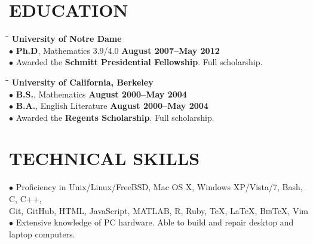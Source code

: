 \documentclass{resume}
\begin{document}
\begin{resume}
	\section{EDUCATION}  \vspace{0.05in}
	\begin{tabbing}
\hspace{2.3in}\= \hspace{2.6in}\= \kill
\textbf{University of Notre Dame} \\
$\bullet$ \textbf{Ph.D}, Mathematics 3.9/4.0 \>\>\textbf{August 2007--May 2012}
\\ 
$\bullet$ Awarded the \textbf{Schmitt Presidential Fellowship}. Full scholarship. \\
      \end{tabbing}	
	\vspace{-0.5in} 
	\begin{tabbing}
\hspace{2.3in}\= \hspace{2.6in}\= \kill
\textbf{University of California, Berkeley}
\\
$\bullet$ \textbf{B.S.}, Mathematics \>\>\textbf{August 2000--May 2004}
\\
$\bullet$ \textbf{B.A.}, English Literature \>\>\textbf{August 2000--May 2004}
\\
$\bullet$ Awarded the \textbf{Regents Scholarship}. Full scholarship.

\end{tabbing}

\section{TECHNICAL SKILLS} \vspace{0.05in}
	$\bullet$ Proficiency in 
	Unix/Linux/FreeBSD, Mac OS X, Windows XP/Vista/7, Bash, C, C++, \\
	\phantom{$\bullet$} Git, GitHub, HTML, 
JavaScript, MATLAB, R, Ruby, \TeX{}, \LaTeX{}, B\textsc{ib}\TeX{}, Vim\\
$\bullet$ Extensive knowledge of PC hardware. Able to build and repair desktop
and laptop computers. 

\end{resume}
\end{document}
